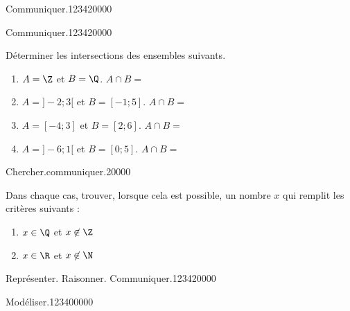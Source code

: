 \begin{pageParcoursu}
\begin{ExoCu}{Communiquer.}{1234}{2}{0}{0}{0}{0}
\end{ExoCu}



\begin{ExoCu}{Communiquer.}{1234}{2}{0}{0}{0}{0}

Déterminer les intersections des ensembles suivants.
\begin{enumerate}
\item $A = \Z$ et $B = \Q$. $A \cap B = $ 
\item $A = ]-2;3[$ et $B =[-1;5]$. $A \cap B = $ 
\item $A = [-4;3]$ et $B =[2;6]$. $A \cap B = $ 
\item $A = ]-6;1[$ et $B =[0;5]$. $A \cap B = $ 
\end{enumerate}
\end{ExoCu}


\begin{ExoCu}{Chercher.communiquer.}{2}{0}{0}{0}{0}
 
Dans chaque cas, trouver, lorsque cela est possible, un nombre $x$ qui remplit les critères suivants :
\begin{enumerate}
\item $x \in \Q$ et $x \not\in \Z$ 
\item $x \in \R$ et $x \not\in \N$ 
\end{enumerate}
\end{ExoCu}

 





\begin{ExoCu}{Représenter. Raisonner. Communiquer.}{1234}{2}{0}{0}{0}{0}


 \end{ExoCu}



\begin{ExoCu}{Modéliser.}{1234}{0}{0}{0}{0}{0}

 
 
\end{ExoCu}
 


\end{pageParcoursu}
  
